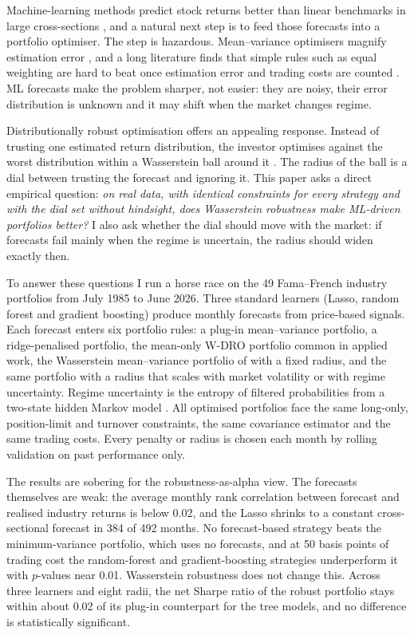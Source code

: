 \documentclass[11pt]{article}
\begin{document}
Machine-learning methods predict stock returns better than linear benchmarks in large cross-sections \citep{gu2020}, and a natural next step is to feed those forecasts into a portfolio optimiser. The step is hazardous. Mean--variance optimisers magnify estimation error \citep{michaud1989}, and a long literature finds that simple rules such as equal weighting are hard to beat once estimation error and trading costs are counted \citep{demiguel2009rfs}. ML forecasts make the problem sharper, not easier: they are noisy, their error distribution is unknown and it may shift when the market changes regime.

Distributionally robust optimisation offers an appealing response. Instead of trusting one estimated return distribution, the investor optimises against the worst distribution within a Wasserstein ball around it \citep{esfahani2018,kuhn2019}. The radius of the ball is a dial between trusting the forecast and ignoring it. This paper asks a direct empirical question: \emph{on real data, with identical constraints for every strategy and with the dial set without hindsight, does Wasserstein robustness make ML-driven portfolios better?} I also ask whether the dial should move with the market: if forecasts fail mainly when the regime is uncertain, the radius should widen exactly then.

To answer these questions I run a horse race on the 49 Fama--French industry portfolios from July 1985 to June 2026. Three standard learners (Lasso, random forest and gradient boosting) produce monthly forecasts from price-based signals. Each forecast enters six portfolio rules: a plug-in mean--variance portfolio, a ridge-penalised portfolio, the mean-only W-DRO portfolio common in applied work, the Wasserstein mean--variance portfolio of \citet{blanchet2022} with a fixed radius, and the same portfolio with a radius that scales with market volatility or with regime uncertainty. Regime uncertainty is the entropy of filtered probabilities from a two-state hidden Markov model \citep{hamilton1989}. All optimised portfolios face the same long-only, position-limit and turnover constraints, the same covariance estimator and the same trading costs. Every penalty or radius is chosen each month by rolling validation on past performance only.

The results are sobering for the robustness-as-alpha view. The forecasts themselves are weak: the average monthly rank correlation between forecast and realised industry returns is below 0.02, and the Lasso shrinks to a constant cross-sectional forecast in 384 of 492 months. No forecast-based strategy beats the minimum-variance portfolio, which uses no forecasts, and at 50 basis points of trading cost the random-forest and gradient-boosting strategies underperform it with $p$-values near 0.01. Wasserstein robustness does not change this. Across three learners and eight radii, the net Sharpe ratio of the robust portfolio stays within about 0.02 of its plug-in counterpart for the tree models, and no difference is statistically significant.
\end{document}
